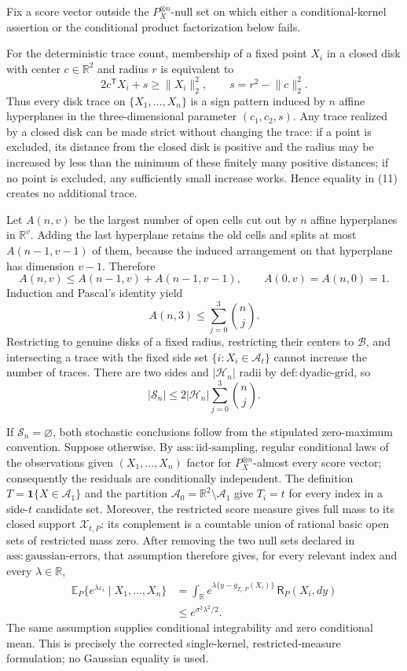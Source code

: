 Fix a score vector outside the \(P_X^{\otimes n}\)-null set on which either a conditional-kernel assertion or the conditional product factorization below fails.

For the deterministic trace count, membership of a fixed point \(X_i\) in a closed disk with center \(c\in\mathbb R^2\) and radius \(r\) is equivalent to
\[
 2c^{\mathsf T}X_i+s\ge \lVert X_i\rVert_2^2,
 \qquad s=r^2-\lVert c\rVert_2^2. \tag{11}
\]
Thus every disk trace on \(\{X_1,\ldots,X_n\}\) is a sign pattern induced by \(n\) affine hyperplanes in the three-dimensional parameter \((c_1,c_2,s)\). Any trace realized by a closed disk can be made strict without changing the trace: if a point is excluded, its distance from the closed disk is positive and the radius may be increased by less than the minimum of these finitely many positive distances; if no point is excluded, any sufficiently small increase works. Hence equality in (11) creates no additional trace.

Let \(A(n,v)\) be the largest number of open cells cut out by \(n\) affine hyperplanes in \(\mathbb R^v\). Adding the last hyperplane retains the old cells and splits at most \(A(n-1,v-1)\) of them, because the induced arrangement on that hyperplane has dimension \(v-1\). Therefore
\[
 A(n,v)\le A(n-1,v)+A(n-1,v-1),
 \qquad A(0,v)=A(n,0)=1. \tag{12}
\]
Induction and Pascal's identity yield
\[
 A(n,3)\le\sum_{j=0}^3\binom nj. \tag{13}
\]
Restricting to genuine disks of a fixed radius, restricting their centers to \(\mathcal B\), and intersecting a trace with the fixed side set \(\{i:X_i\in\mathcal A_t\}\) cannot increase the number of traces. There are two sides and \(|\mathcal H_n|\) radii by \(\mathrm{def:dyadic\text{-}grid}\), so
\[
 |\mathscr S_n|\le2|\mathcal H_n|\sum_{j=0}^3\binom nj. \tag{14}
\]

If \(\mathscr S_n=\varnothing\), both stochastic conclusions follow from the stipulated zero-maximum convention. Suppose otherwise. By \(\mathrm{ass:iid\text{-}sampling}\), regular conditional laws of the observations given \((X_1,\ldots,X_n)\) factor for \(P_X^{\otimes n}\)-almost every score vector; consequently the residuals are conditionally independent. The definition \(T=\mathbf 1\{X\in\mathcal A_1\}\) and the partition \(\mathcal A_0=\mathbb R^2\setminus\mathcal A_1\) give \(T_i=t\) for every index in a side-\(t\) candidate set. Moreover, the restricted score measure gives full mass to its closed support \(\mathcal X_{t,P}\): its complement is a countable union of rational basic open sets of restricted mass zero. After removing the two null sets declared in \(\mathrm{ass:gaussian\text{-}errors}\), that assumption therefore gives, for every relevant index and every \(\lambda\in\mathbb R\),
\[
 \begin{aligned}
 \mathbb E_P\{e^{\lambda\varepsilon_i}\mid X_1,\ldots,X_n\}
 &=\int_{\mathbb R}
 e^{\lambda\{y-g_{T_i,P}(X_i)\}}\,\mathsf R_P(X_i,dy)\\
 &\le e^{\sigma^2\lambda^2/2}.
 \end{aligned} \tag{15}
\]
The same assumption supplies conditional integrability and zero conditional mean. This is precisely the corrected single-kernel, restricted-measure formulation; no Gaussian equality is used.

